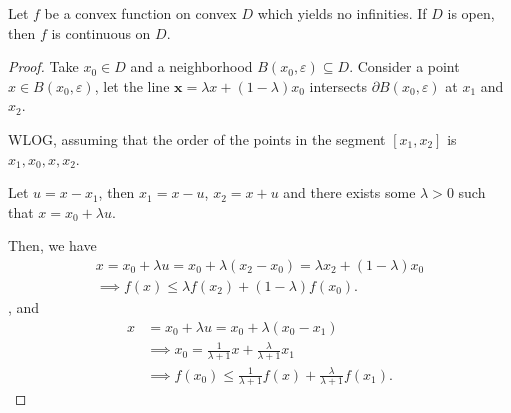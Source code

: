\begin{theorem}
  Let \( f \) be a convex function on convex \( D \) which yields no infinities.
  If \( D \) is open, then \( f \) is continuous on \( D \).
\end{theorem}

\begin{proof}
  Take \( x_{0} \in D \) and a neighborhood \( B(x_{0}, \varepsilon) \subseteq D
  \). Consider a point \( x \in B(x_{0}, \varepsilon) \), let the line \(
  \mathbf{x} = \lambda x + (1- \lambda) x_{0} \) intersects \( \partial
  B(x_{0}, \varepsilon) \) at \( x_{1} \) and \( x_{2} \).

  WLOG, assuming that the order of the points in the segment \( [x_{1}, x_{2}]
  \) is \( x_{1}, x_{0}, x, x_{2} \).


  Let \( u = x - x_{1} \), then \( x_{1} = x - u \), \( x_{2} = x+ u \) and
  there exists some \( \lambda > 0 \) such that \( x = x_{0} + \lambda u \).

  Then, we have
  \begin{align*}
    x = x_{0} + \lambda u = x_{0} + \lambda (x_{2} - x_{0}) = \lambda x_{2} + (1
    - \lambda) x_{0}\\
    \implies f(x) \le \lambda f(x_{2}) + (1- \lambda) f(x_{0})
  .\end{align*}, and
  \begin{align*}
    x &= x_{0} + \lambda u = x_{0} + \lambda ( x_{0} - x_{1}) \\
    &\implies x_{0} = \frac{1}{\lambda + 1} x + \frac{\lambda}{\lambda + 1}
    x_{1}\\
    &\implies f(x_{0}) \le  \frac{1}{\lambda + 1} f(x) + \frac{\lambda}{\lambda +
    1} f(x_{1})
  .\end{align*}


\end{proof}
